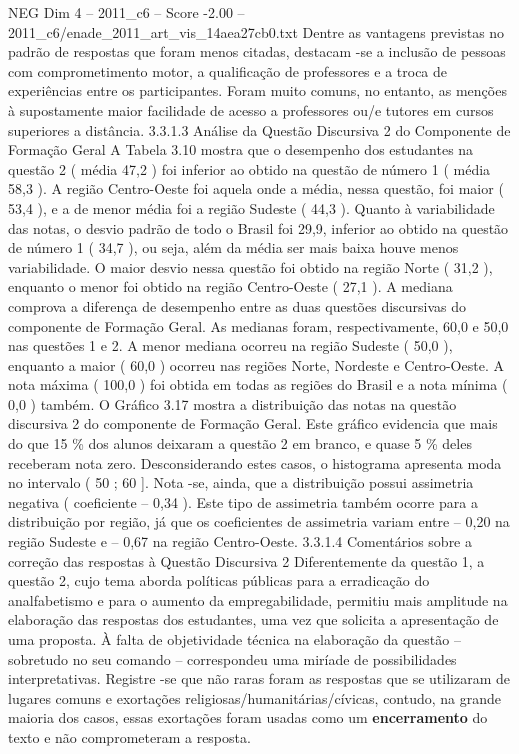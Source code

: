 \begin{textsample}{NEG Dim 4 – 2011\_c6 – Score -2.00 – 2011\_c6/enade\_2011\_art\_vis\_14aea27cb0.txt}
Dentre as vantagens previstas no padrão de respostas que foram menos citadas, destacam -se a inclusão de pessoas com comprometimento motor, a qualificação de professores e a troca de experiências entre os participantes.
Foram muito comuns, no entanto, as menções à supostamente maior facilidade de acesso a professores ou/e tutores em cursos superiores a distância. 3.3.1.3 Análise da Questão Discursiva 2 do Componente de Formação Geral A Tabela 3.10 mostra que o desempenho dos estudantes na questão 2 ( média 47,2 ) foi inferior ao obtido na questão de número 1 ( média 58,3 ).
A região Centro-Oeste foi aquela onde a média, nessa questão, foi maior ( 53,4 ), e a de menor média foi a região Sudeste ( 44,3 ).
Quanto à variabilidade das notas, o desvio padrão de todo o Brasil foi 29,9, inferior ao obtido na questão de número 1 ( 34,7 ), ou seja, além da média ser mais baixa houve menos variabilidade.
O maior desvio nessa questão foi obtido na região Norte ( 31,2 ), enquanto o menor foi obtido na região Centro-Oeste ( 27,1 ).
A mediana comprova a diferença de desempenho entre as duas questões discursivas do componente de Formação Geral.
As medianas foram, respectivamente, 60,0 e 50,0 nas questões 1 e 2.
A menor mediana ocorreu na região Sudeste ( 50,0 ), enquanto a maior ( 60,0 ) ocorreu nas regiões Norte, Nordeste e Centro-Oeste.
A nota máxima ( 100,0 ) foi obtida em todas as regiões do Brasil e a nota mínima ( 0,0 ) também.
O Gráfico 3.17 mostra a distribuição das notas na questão discursiva 2 do componente de Formação Geral.
Este gráfico evidencia que mais do que 15 \% dos alunos deixaram a questão 2 em branco, e quase 5 \% deles receberam nota zero.
Desconsiderando estes casos, o histograma apresenta moda no intervalo ( 50 ; 60 ].
Nota -se, ainda, que a distribuição possui assimetria negativa ( coeficiente – 0,34 ).
Este tipo de assimetria também ocorre para a distribuição por região, já que os coeficientes de assimetria variam entre – 0,20 na região Sudeste e – 0,67 na região Centro-Oeste. 3.3.1.4 Comentários sobre a correção das respostas à Questão Discursiva 2 Diferentemente da questão 1, a questão 2, cujo tema aborda políticas públicas para a erradicação do analfabetismo e para o aumento da empregabilidade, permitiu mais amplitude na elaboração das respostas dos estudantes, uma vez que solicita a apresentação de uma proposta.
À falta de objetividade técnica na elaboração da questão – sobretudo no seu comando – correspondeu uma miríade de possibilidades interpretativas.
Registre -se que não raras foram as respostas que se utilizaram de lugares comuns e exortações religiosas/humanitárias/cívicas, contudo, na grande maioria dos casos, essas exortações foram usadas como um \textbf{encerramento} do texto e não comprometeram a resposta.

\end{textsample}
